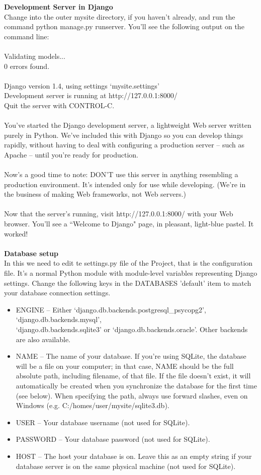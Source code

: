 \newpage
{\bf Development Server in Django}\\
Change into the outer mysite directory, if you haven't already, and run the command python manage.py runserver. You'll see the following output on the command line:\\\\
Validating models...\\
0 errors found.\\\\
Django version 1.4, using settings `mysite.settings'\\
Development server is running at http://127.0.0.1:8000/\\
Quit the server with CONTROL-C.\\\\
You've started the Django development server, a lightweight Web server written purely in Python. We've included this with Django so you can develop things rapidly, without having to deal with configuring a production server -- such as Apache -- until you're ready for production.\\\\
Now's a good time to note: DON'T use this server in anything resembling a production environment. It's intended only for use while developing. (We're in the business of making Web frameworks, not Web servers.)\\\\
Now that the server's running, visit http://127.0.0.1:8000/ with your Web browser. You'll see a ``Welcome to Django" page, in pleasant, light-blue pastel. It worked!\\\\
{\bf Database setup}\\
In this we need to edit te settings.py file of the Project, that is the configuration file. 
It's a normal Python module with module-level variables representing Django settings. Change the following keys in the DATABASES 'default' item to match your database connection settings.\\
\begin{itemize}
\item ENGINE -- Either `django.db.backends.postgresql\_psycopg2', `django.db.backends.mysql',\\ `django.db.backends.sqlite3' or `django.db.backends.oracle'. Other backends are also available.
\item NAME -- The name of your database. If you're using SQLite, the database will be a file on your computer; in that case, NAME should be the full absolute path, including filename, of that file. If the file doesn't exist, it will automatically be created when you synchronize the database for the first time (see below).
When specifying the path, always use forward slashes, even on Windows (e.g. C:/homes/user/mysite/sqlite3.db).
\item USER -- Your database username (not used for SQLite).
\item PASSWORD -- Your database password (not used for SQLite).
\item HOST -- The host your database is on. Leave this as an empty string if your database server is on the same physical machine (not used for SQLite).
\end{itemize}

